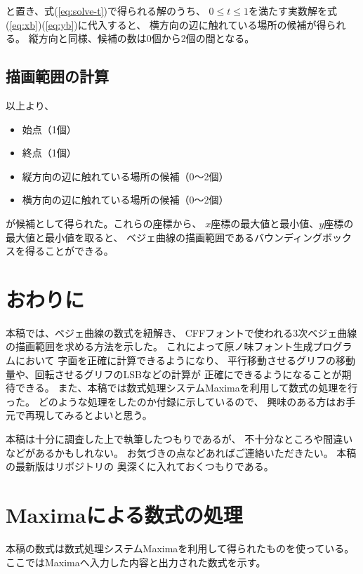 \documentclass[dvipdfmx]{jsarticle}
\begin{document}
と置き、式(\ref{eq:solve-t})で得られる解のうち、
$0\leq t\leq 1$を満たす実数解を式(\ref{eq:xb})(\ref{eq:yb})に代入すると、
横方向の辺に触れている場所の候補が得られる。
縦方向と同様、候補の数は0個から2個の間となる。

\subsection{描画範囲の計算}

以上より、

\begin{itemize}
\item 始点（1個）
\item 終点（1個）
\item 縦方向の辺に触れている場所の候補（0～2個）
\item 横方向の辺に触れている場所の候補（0～2個）
\end{itemize}

が候補として得られた。これらの座標から、
$x$座標の最大値と最小値、$y$座標の最大値と最小値を取ると、
ベジェ曲線の描画範囲であるバウンディングボックスを得ることができる。

\section{おわりに}

本稿では、ベジェ曲線の数式を紐解き、
CFFフォントで使われる3次ベジェ曲線の描画範囲を求める方法を示した。
これによって原ノ味フォント生成プログラムにおいて
字面を正確に計算できるようになり、
平行移動させるグリフの移動量や、回転させるグリフのLSBなどの計算が
正確にできるようになることが期待できる。
また、本稿では数式処理システムMaximaを利用して数式の処理を行った。
どのような処理をしたのか付録に示しているので、
興味のある方はお手元で再現してみるとよいと思う。

本稿は十分に調査した上で執筆したつもりであるが、
不十分なところや間違いなどがあるかもしれない。
お気づきの点などあればご連絡いただきたい。
本稿の最新版はリポジトリ\cite{haranoaji-generator}の
奥深くに入れておくつもりである。

\appendix

\section{Maximaによる数式の処理}

本稿の数式は数式処理システムMaximaを利用して得られたものを使っている。
ここではMaximaへ入力した内容と出力された数式を示す。
\end{document}
